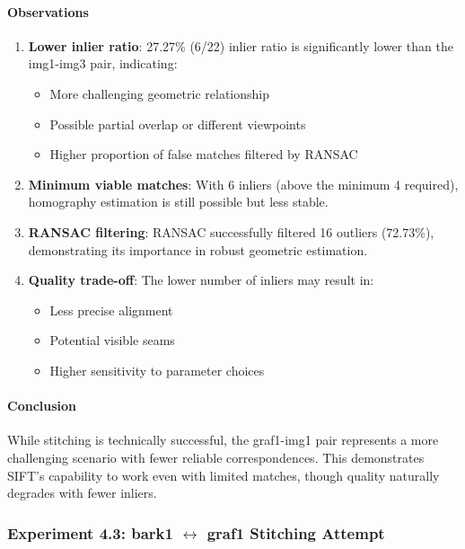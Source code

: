 \documentclass[12pt,a4paper]{article}
\begin{document}
\paragraph{Observations}
\begin{enumerate}
    \item \textbf{Lower inlier ratio}: 27.27\% (6/22) inlier ratio is significantly lower than the img1-img3 pair, indicating:
    \begin{itemize}
        \item More challenging geometric relationship
        \item Possible partial overlap or different viewpoints
        \item Higher proportion of false matches filtered by RANSAC
    \end{itemize}
    
    \item \textbf{Minimum viable matches}: With 6 inliers (above the minimum 4 required), homography estimation is still possible but less stable.
    
    \item \textbf{RANSAC filtering}: RANSAC successfully filtered 16 outliers (72.73\%), demonstrating its importance in robust geometric estimation.
    
    \item \textbf{Quality trade-off}: The lower number of inliers may result in:
    \begin{itemize}
        \item Less precise alignment
        \item Potential visible seams
        \item Higher sensitivity to parameter choices
    \end{itemize}
\end{enumerate}

\paragraph{Conclusion}
While stitching is technically successful, the graf1-img1 pair represents a more challenging scenario with fewer reliable correspondences. This demonstrates SIFT's capability to work even with limited matches, though quality naturally degrades with fewer inliers.

\subsubsection{Experiment 4.3: bark1 $\leftrightarrow$ graf1 Stitching Attempt}
\end{document}
